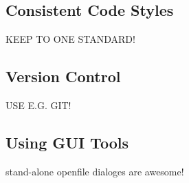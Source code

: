 \subsection{Consistent Code Styles}

KEEP TO ONE STANDARD!

\subsection{Version Control}

USE E.G. GIT!

\subsection{Using GUI Tools}

stand-alone openfile dialoges are awesome!